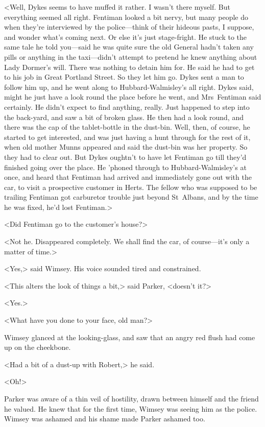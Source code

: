 <Well, Dykes seems to have muffed it rather. I wasn't there myself. But everything seemed all right. Fentiman looked a bit nervy, but many people do when they're interviewed by the police—think of their hideous pasts, I suppose, and wonder what's coming next. Or else it's just stage-fright. He stuck to the same tale he told you—said he was quite sure the old General hadn't taken any pills or anything in the taxi—didn't attempt to pretend he knew anything about Lady Dormer's will. There was nothing to detain him for. He said he had to get to his job in Great Portland Street. So they let him go. Dykes sent a man to follow him up, and he went along to Hubbard-Walmisley's all right. Dykes said, might he just have a look round the place before he went, and Mrs~Fentiman said certainly. He didn't expect to find anything, really. Just happened to step into the back-yard, and saw a bit of broken glass. He then had a look round, and there was the cap of the tablet-bottle in the dust-bin. Well, then, of course, he started to get interested, and was just having a hunt through for the rest of it, when old mother Munns appeared and said the dust-bin was her property. So they had to clear out. But Dykes oughtn't to have let Fentiman go till they'd finished going over the place. He 'phoned through to Hubbard-Walmisley's at once, and heard that Fentiman had arrived and immediately gone out with the car, to visit a prospective customer in Herts. The fellow who was supposed to be trailing Fentiman got carburetor trouble just beyond St~Albans, and by the time he was fixed, he'd lost Fentiman.>

<Did Fentiman go to the customer's house?>

<Not he. Disappeared completely. We shall find the car, of course—it's only a matter of time.>

<Yes,> said Wimsey. His voice sounded tired and constrained.

<This alters the look of things a bit,> said Parker, <doesn't it?>

<Yes.>

<What have you done to your face, old man?>

Wimsey glanced at the looking-glass, and saw that an angry red flush had come up on the cheekbone.

<Had a bit of a dust-up with Robert,> he said.

<Oh!>

Parker was aware of a thin veil of hostility, drawn between himself and the friend he valued. He knew that for the first time, Wimsey was seeing him as the police. Wimsey was ashamed and his shame made Parker ashamed too.


